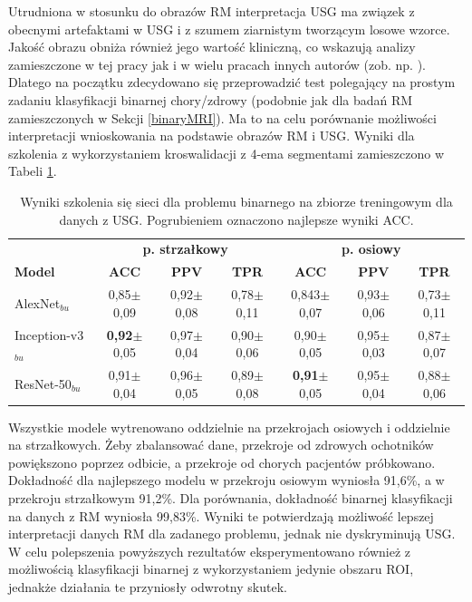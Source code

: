 Utrudniona w stosunku do obrazów RM interpretacja USG ma związek z obecnymi artefaktami w USG i z szumem ziarnistym tworzącym losowe wzorce. Jakość obrazu obniża również jego wartość kliniczną, co wskazują analizy zamieszczone w tej pracy jak i w wielu pracach innych autorów (zob. np. \cite{Khan2003, Ibrahim2013}). Dlatego na początku zdecydowano się przeprowadzić test polegający na prostym zadaniu klasyfikacji binarnej chory/zdrowy (podobnie jak dla badań RM zamieszczonych w Sekcji \ref{binaryMRI}). Ma to na celu porównanie możliwości interpretacji wnioskowania na podstawie obrazów RM i USG. Wyniki dla szkolenia z wykorzystaniem kroswalidacji z 4-ema segmentami zamieszczono w Tabeli \ref{tab:usg-binary}.
\renewcommand{\arraystretch}{1.2}
\begin{table}[]
	\centering
	\scriptsize
	\setlength{\tabcolsep}{3pt}
	\setlength\extrarowheight{2pt}
	\caption{Wyniki szkolenia się sieci dla problemu binarnego na zbiorze treningowym dla danych z USG. Pogrubieniem oznaczono najlepsze wyniki ACC.}
	\label{tab:usg-binary}
	\begin{tabular}{l||c|c|c||c|c|c}
		& \multicolumn{3}{c}{\textbf{p. strzałkowy}} & \multicolumn{3}{c}{\textbf{p. osiowy}} \\
		\textbf{Model} & \textbf{ACC} & \textbf{PPV} & \textbf{TPR} & \textbf{ACC} & \textbf{PPV} & \textbf{TPR} \\ \hline \hline
		AlexNet$_{bu}$ & 0,85$\pm$0,09 & 0,92$\pm$0,08 & 0,78$\pm$0,11 & 0,843$\pm$0,07 & 0,93$\pm$0,06 & 0,73$\pm$0,11  \\ \hline
		Inception-v3$_{bu}$ & \textbf{0,92}$\pm$0,05 & 0,97$\pm$0,04 & 0,90$\pm$0,06 & 0,90$\pm$0,05 & 0,95$\pm$0,03 & 0,87$\pm$0,07 \\ \hline
		ResNet-50$_{bu}$ & 0,91$\pm$0,04 & 0,96$\pm$0,05 & 0,89$\pm$0,08 & \textbf{0,91}$\pm$0,05 & 0,95$\pm$0,04 & 0,88$\pm$0,06 \\ 
	\end{tabular}
\end{table}
\renewcommand{\arraystretch}{1}

Wszystkie modele wytrenowano oddzielnie na przekrojach osiowych i oddzielnie na strzałkowych. Żeby zbalansować dane, przekroje od zdrowych ochotników powiększono poprzez odbicie, a przekroje od chorych pacjentów próbkowano. Dokładność dla najlepszego modelu w przekroju osiowym wyniosła 91,6\%, a w przekroju strzałkowym 91,2\%. Dla porównania, dokładność binarnej klasyfikacji na danych z RM wyniosła 99,83\%. Wyniki te potwierdzają możliwość lepszej interpretacji danych RM dla zadanego problemu, jednak nie dyskryminują USG. W celu polepszenia powyższych rezultatów eksperymentowano również z możliwością klasyfikacji binarnej z wykorzystaniem jedynie obszaru ROI, jednakże działania te przyniosły odwrotny skutek.  

